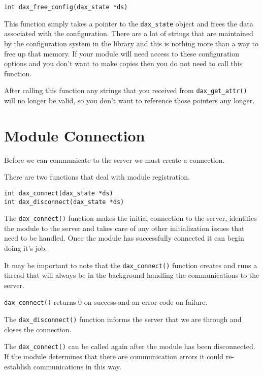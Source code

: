 \begin{verbatim}
int dax_free_config(dax_state *ds)
\end{verbatim}

This function simply takes a pointer to the \verb|dax_state| object and frees
the data associated with the configuration.  There are a lot of strings that are
maintained by the configuration system in the library and this is nothing more
than a way to free up that memory.  If your module will need access to these
configuration options and you don't want to make copies then you do not need to
call this function.

After calling this function any strings that you received from
\verb|dax_get_attr()| will no longer be valid, so you don't want to reference
those pointers any longer.

\section{Module Connection}
Before we can communicate to the server we must create a connection.

There are two functions that deal with module registration.
\begin{verbatim}
int dax_connect(dax_state *ds)
int dax_disconnect(dax_state *ds)
\end{verbatim}

The \verb|dax_connect()| function makes the
initial connection to the server, identifies the module to the server and takes
care of any other initialization issues that need to be handled.  Once the
module has successfully connected it can begin doing it's job.

It may be important to note that the \verb|dax_connect()| function creates
and runs a thread that will always be in the background handling the
communications to the server.

\verb|dax_connect()| returns 0 on success and an error code on failure.

The \verb|dax_disconnect()| function informs
the server that we are through and closes the connection.

The \verb|dax_connect()| can be called again after the module has been
disconnected.  If the module determines that there are communication errors it
could re-establish communications in this way.

